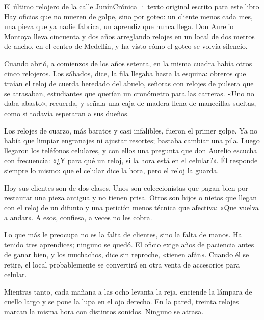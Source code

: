 \begin{texto}{El último relojero de la calle Junín}{Crónica · texto original escrito para este libro}
\pa Hay oficios que no mueren de golpe, sino por goteo: un cliente menos cada mes, una pieza que ya nadie fabrica, un
aprendiz que nunca llega. Don Aurelio Montoya lleva cincuenta y dos años arreglando relojes en un local de dos metros de
ancho, en el centro de Medellín, y ha visto cómo el goteo se volvía silencio.

\pa Cuando abrió, a comienzos de los años setenta, en la misma cuadra había otros cinco relojeros. Los sábados, dice, la
fila llegaba hasta la esquina: obreros que traían el reloj de cuerda heredado del abuelo, señoras con relojes de pulsera
que se atrasaban, estudiantes que querían un cronómetro para las carreras. «Uno no daba abasto», recuerda, y señala una
caja de madera llena de manecillas sueltas, como si todavía esperaran a sus dueños.

\pa Los relojes de cuarzo, más baratos y casi infalibles, fueron el primer golpe. Ya no había que limpiar engranajes ni
ajustar resortes; bastaba cambiar una pila. Luego llegaron los teléfonos celulares, y con ellos una pregunta que don
Aurelio escucha con frecuencia: «¿Y para qué un reloj, si la hora está en el celular?». Él responde siempre lo mismo: que
el celular dice la hora, pero el reloj la guarda.

\pa Hoy sus clientes son de dos clases. Unos son coleccionistas que pagan bien por restaurar una pieza antigua y no tienen
prisa. Otros son hijos o nietos que llegan con el reloj de un difunto y una petición menos técnica que afectiva: «Que
vuelva a andar». A esos, confiesa, a veces no les cobra.

\pa Lo que más le preocupa no es la falta de clientes, sino la falta de manos. Ha tenido tres aprendices; ninguno se quedó.
El oficio exige años de paciencia antes de ganar bien, y los muchachos, dice sin reproche, «tienen afán». Cuando él se
retire, el local probablemente se convertirá en otra venta de accesorios para celular.

\pa Mientras tanto, cada mañana a las ocho levanta la reja, enciende la lámpara de cuello largo y se pone la lupa en el ojo
derecho. En la pared, treinta relojes marcan la misma hora con distintos sonidos. Ninguno se atrasa.
\end{texto}

